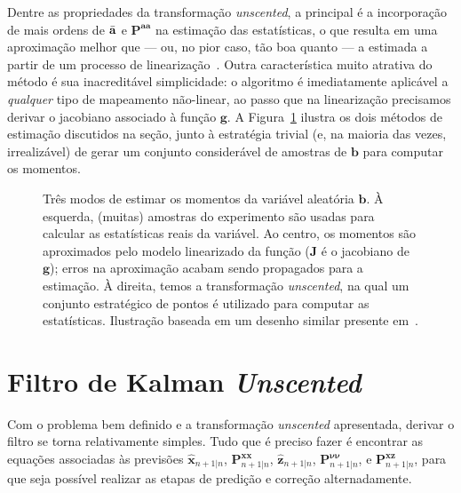 Dentre as propriedades da transformação \textit{unscented}, a principal é a
incorporação de mais ordens de $\Bar{\mathbf{a}}$ e $\mathbf{P}^{\mathbf{a}\mathbf{a}}$
na estimação das estatísticas, o que resulta em uma aproximação melhor que --- ou, no
pior caso, tão boa quanto --- a estimada a partir de um processo de
linearização~\cite{julier-1997}. Outra característica muito atrativa do método é sua
inacreditável simplicidade: o algoritmo é imediatamente aplicável a \emph{qualquer}
tipo de mapeamento não-linear, ao passo que na linearização precisamos derivar o
jacobiano associado à função $\mathbf{g}$. A Figura~\ref{fig:unscented:ut} ilustra os
dois métodos de estimação discutidos na seção, junto à estratégia trivial (e, na
maioria das vezes, irrealizável) de gerar um conjunto considerável de amostras de
$\mathbf{b}$ para computar os momentos.

\begin{figure}[!ht]
	\centering
	
	\caption[Ilustração dos métodos de estimação de momentos]{Três modos de estimar os momentos da variável aleatória $\mathbf{b}$. À esquerda, (muitas) amostras do experimento são usadas para calcular as estatísticas reais da variável. Ao centro, os momentos são aproximados pelo modelo linearizado da função ($\mathbf{J}$ é o jacobiano de $\mathbf{g}$); erros na aproximação acabam sendo propagados para a estimação. À direita, temos a transformação \textit{unscented}, na qual um conjunto estratégico de pontos é utilizado para computar as estatísticas. Ilustração baseada em um desenho similar presente em~\cite{wan-2000}.}
	\label{fig:unscented:ut}
\end{figure}

\section{Filtro de Kalman \textit{Unscented}}

Com o problema bem definido e a transformação \textit{unscented} apresentada, derivar o
filtro se torna relativamente simples. Tudo que é preciso fazer é encontrar as equações
associadas às previsões $\hat{\mathbf{x}}_{n+1|n}$,
$\mathbf{P}_{n+1|n}^{\mathbf{x}\mathbf{x}}$, $\hat{\mathbf{z}}_{n+1|n}$,
$\mathbf{P}_{n+1|n}^{\bm{\nu}\bm{\nu}}$, e $\mathbf{P}_{n+1|n}^{\mathbf{x}\mathbf{z}}$,
para que seja possível realizar as etapas de predição e correção alternadamente.

